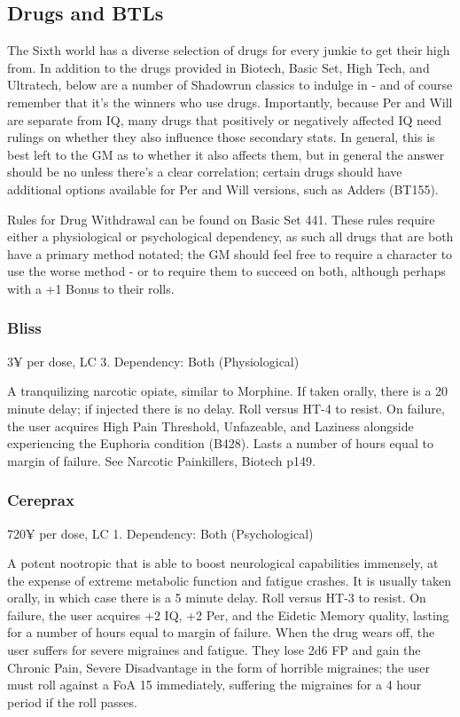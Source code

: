 \subsection{Drugs and BTLs}

The Sixth world has a diverse selection of drugs for every junkie to get their high from. In addition to the drugs provided in Biotech, Basic Set, High Tech, and Ultratech, below are a number of Shadowrun classics to indulge in - and of course remember that it's the winners who use drugs. Importantly, because Per and Will are separate from IQ, many drugs that positively or negatively affected IQ need rulings on whether they also influence those secondary stats. In general, this is best left to the GM as to whether it also affects them, but in general the answer should be no unless there's a clear correlation; certain drugs should have additional options available for Per and Will versions, such as Adders (BT155).

Rules for Drug Withdrawal can be found on Basic Set 441. These rules require either a physiological or psychological dependency, as such all drugs that are both have a primary method notated; the GM should feel free to require a character to use the worse method - or to require them to succeed on both, although perhaps with a +1 Bonus to their rolls.

\subsubsection{Bliss}
\begin{flushleft}
	3¥ per dose, LC 3. 
	Dependency: Both (Physiological)
\end{flushleft}

A tranquilizing narcotic opiate, similar to Morphine. If taken orally, there is a 20 minute delay; if injected there is no delay. Roll versus HT-4 to resist. On failure, the user acquires High Pain Threshold, Unfazeable, and Laziness alongside experiencing the Euphoria condition (B428). Lasts a number of hours equal to margin of failure. See Narcotic Painkillers, Biotech p149.

\subsubsection{Cereprax}
\begin{flushleft}
	720¥ per dose, LC 1. 
	Dependency: Both (Psychological)
\end{flushleft}

A potent nootropic that is able to boost neurological capabilities immensely, at the expense of extreme metabolic function and fatigue crashes. It is usually taken orally, in which case there is a 5 minute delay. Roll versus HT-3 to resist. On failure, the user acquires +2 IQ, +2 Per, and the Eidetic Memory quality, lasting for a number of hours equal to margin of failure. When the drug wears off, the user suffers for severe migraines and fatigue. They lose 2d6 FP and gain the Chronic Pain, Severe Disadvantage in the form of horrible migraines; the user must roll against a FoA 15 immediately, suffering the migraines for a 4 hour period if the roll passes.

